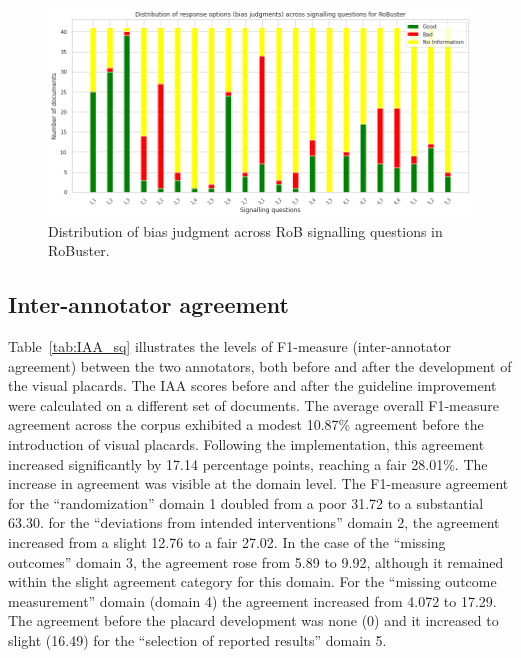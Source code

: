 \documentclass[sn-mathphys,Numbered]{sn-jnl}%
\theoremstyle{thmstyleone}%
\theoremstyle{thmstyletwo}%
\theoremstyle{thmstylethree}%
\begin{document}
%
%
%
\begin{figure}[htb]
    \centering
    \includegraphics[width=0.90\columnwidth]{figures/bias_chart.png}
    \caption{Distribution of bias judgment across RoB signalling questions in RoBuster.}
    \label{fig:rob_information}
\end{figure}
%
%
%

%
%
%
\subsection{Inter-annotator agreement}
\label{result:iaa}
%
Table~\ref{tab:IAA_sq} illustrates the levels of F1-measure (inter-annotator agreement) between the two annotators, both before and after the development of the visual placards.
The IAA scores before and after the guideline improvement were calculated on a different set of documents.
The average overall F1-measure agreement across the corpus exhibited a modest 10.87\% agreement before the introduction of visual placards. Following the implementation, this agreement increased significantly by 17.14 percentage points, reaching a fair 28.01\%.
The increase in agreement was visible at the domain level.
The F1-measure agreement for the ``randomization'' domain 1 doubled from a poor 31.72 to a substantial 63.30.
for the ``deviations from intended interventions'' domain 2, the agreement increased from a slight 12.76 to a fair 27.02.
In the case of the ``missing outcomes'' domain 3, the agreement rose from 5.89 to 9.92, although it remained within the slight agreement category for this domain. 
For the ``missing outcome measurement'' domain (domain 4) the agreement increased from 4.072 to 17.29.
The agreement before the placard development was none (0) and it increased to slight (16.49) for the ``selection of reported results'' domain 5.
\end{document}
